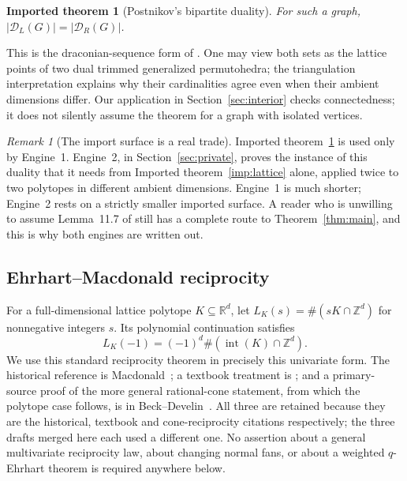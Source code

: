 \documentclass[11pt]{article}
\numberwithin{equation}{section}
\newtheorem{imported}[theorem]{Imported theorem}
\theoremstyle{definition}
\theoremstyle{remark}
\newtheorem{remark}[theorem]{Remark}
\newcommand{\Z}{\mathbb Z}
\newcommand{\R}{\mathbb R}
\newcommand{\Int}{\operatorname{int}}
\newcommand{\Dr}{\mathcal D}
\begin{document}
\begin{imported}[Postnikov's bipartite duality]
\label{imp:duality}
For such a graph, $|\Dr_L(G)|=|\Dr_R(G)|$.
\end{imported}

This is the draconian-sequence form of \cite[Lemma~11.7 and
Corollary~11.8]{Postnikov}. One may view both sets as the lattice points of
two dual trimmed generalized permutohedra; the triangulation interpretation
explains why their cardinalities agree even when their ambient dimensions
differ. Our application in Section~\ref{sec:interior} checks connectedness; it
does not silently assume the theorem for a graph with isolated vertices.

\begin{remark}[The import surface is a real trade]
\label{rem:import-trade}
Imported theorem~\ref{imp:duality} is used only by Engine~1. Engine~2, in
Section~\ref{sec:private}, proves the instance of this duality that it needs
from Imported theorem~\ref{imp:lattice} alone, applied twice to two polytopes
in different ambient dimensions. Engine~1 is much shorter; Engine~2 rests on a
strictly smaller imported surface. A reader who is unwilling to assume
Lemma~11.7 of \cite{Postnikov} still has a complete route to
Theorem~\ref{thm:main}, and this is why both engines are written out.
\end{remark}

\subsection{Ehrhart--Macdonald reciprocity}
\label{sec:imports-ehrhart}

For a full-dimensional lattice polytope $K\subseteq\R^d$, let
$L_K(s)=\#(sK\cap\Z^d)$ for nonnegative integers $s$. Its polynomial
continuation satisfies
\begin{equation}
 L_K(-1)=(-1)^{d}\#(\Int(K)\cap\Z^{d}).
 \label{eq:ehrhart-reciprocity}
\end{equation}
We use this standard reciprocity theorem in precisely this univariate form.
The historical reference is Macdonald~\cite{Macdonald}; a textbook treatment
is \cite[Chapter~4]{BeckRobins}; and a primary-source proof of the more
general rational-cone statement, from which the polytope case follows, is in
Beck--Develin~\cite{BeckDevelin}. All three are retained because they are the
historical, textbook and cone-reciprocity citations respectively; the three
drafts merged here each used a different one. No assertion about a general
multivariate reciprocity law, about changing normal fans, or about a weighted
$q$-Ehrhart theorem is required anywhere below.
\end{document}
